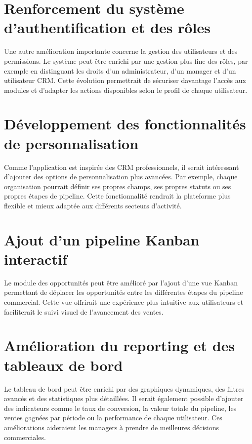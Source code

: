 \documentclass[12pt,a4paper]{report}
\begin{document}
\section*{Renforcement du système d’authentification et des rôles}

Une autre amélioration importante concerne la gestion des utilisateurs et des permissions. Le système peut être enrichi par une gestion plus fine des rôles, par exemple en distinguant les droits d’un administrateur, d’un manager et d’un utilisateur CRM. Cette évolution permettrait de sécuriser davantage l’accès aux modules et d’adapter les actions disponibles selon le profil de chaque utilisateur.

\section*{Développement des fonctionnalités de personnalisation}

Comme l’application est inspirée des CRM professionnels, il serait intéressant d’ajouter des options de personnalisation plus avancées. Par exemple, chaque organisation pourrait définir ses propres champs, ses propres statuts ou ses propres étapes de pipeline. Cette fonctionnalité rendrait la plateforme plus flexible et mieux adaptée aux différents secteurs d’activité.

\section*{Ajout d’un pipeline Kanban interactif}

Le module des opportunités peut être amélioré par l’ajout d’une vue Kanban permettant de déplacer les opportunités entre les différentes étapes du pipeline commercial. Cette vue offrirait une expérience plus intuitive aux utilisateurs et faciliterait le suivi visuel de l’avancement des ventes.

\section*{Amélioration du reporting et des tableaux de bord}

Le tableau de bord peut être enrichi par des graphiques dynamiques, des filtres avancés et des statistiques plus détaillées. Il serait également possible d’ajouter des indicateurs comme le taux de conversion, la valeur totale du pipeline, les ventes gagnées par période ou la performance de chaque utilisateur. Ces améliorations aideraient les managers à prendre de meilleures décisions commerciales.
\end{document}

